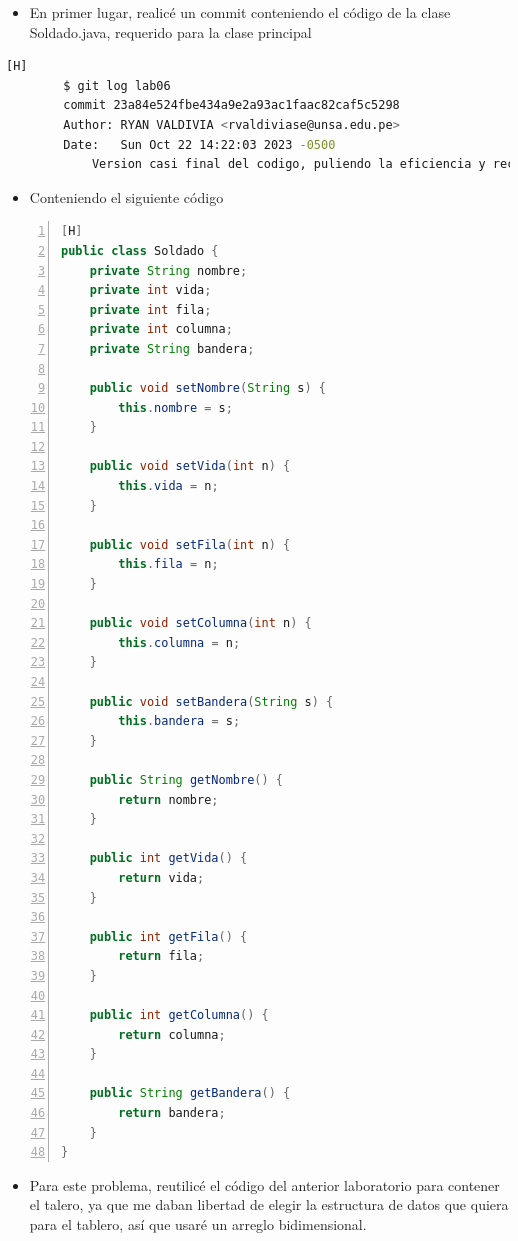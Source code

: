 \documentclass{article}
\begin{document}
	\begin{itemize}	
		\item En primer lugar, realicé un commit conteniendo el código de la clase Soldado.java, requerido para la clase principal
	\end{itemize}	
	\begin{lstlisting}[language=bash,caption={Obteniendo la clase Soldado}][H]
		$ git log lab06
		commit 23a84e524fbe434a9e2a93ac1faac82caf5c5298
		Author: RYAN VALDIVIA <rvaldiviase@unsa.edu.pe>
		Date:   Sun Oct 22 14:22:03 2023 -0500
			Version casi final del codigo, puliendo la eficiencia y reciclando el codigo de laboratorios pasados, pero adaptandolos a mapas
	\end{lstlisting}
	\begin{itemize}	
		\item Conteniendo el siguiente código
	\end{itemize}
	\begin{lstlisting}[language=java,caption={Clase Soldado}, numbers=left][H]
public class Soldado {
    private String nombre;
    private int vida;
    private int fila;
    private int columna;
    private String bandera;

    public void setNombre(String s) {
        this.nombre = s;
    }

    public void setVida(int n) {
        this.vida = n;
    }

    public void setFila(int n) {
        this.fila = n;
    }

    public void setColumna(int n) {
        this.columna = n;
    }

    public void setBandera(String s) {
        this.bandera = s;
    }

    public String getNombre() {
        return nombre;
    }

    public int getVida() {
        return vida;
    }

    public int getFila() {
        return fila;
    }

    public int getColumna() {
        return columna;
    }

    public String getBandera() {
        return bandera;
    }
}

	\end{lstlisting}
	\begin{itemize}	
		\item Para este problema, reutilicé el código del anterior laboratorio para contener el talero, ya que me daban libertad de elegir la estructura de datos que quiera para el tablero, así que usaré un arreglo bidimensional.
	\end{itemize}
\end{document}
